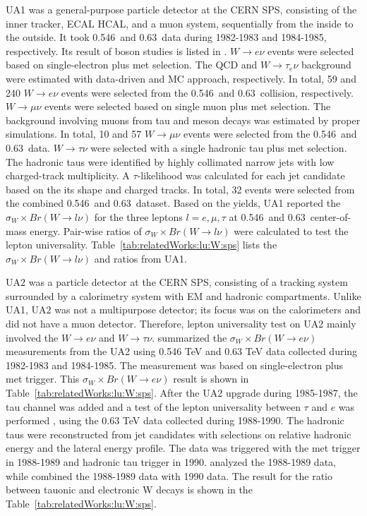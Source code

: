 UA1 was a general-purpose particle detector at the CERN SPS, consisting of the inner tracker, ECAL HCAL, and a muon system, sequentially from the inside to the outside.  It took 0.546~\TeV and 0.63~\TeV data during 1982-1983 and 1984-1985, respectively. Its result of \PW boson studies is listed in \cite{Albajar:1988ka}. $W \to e \nu$ events were selected based on single-electron plus met selection. The QCD and $W\to \tau_e \nu$ background were estimated with data-driven and MC approach, respectively. In total, 59 and 240 $W \to e \nu$ events were selected from the 0.546~\TeV and 0.63~\TeV collision, respectively.  $W \to \mu \nu$ events were selected based on single muon plus met selection. The background involving muons from tau and meson decays was estimated by proper simulations. In total, 10 and 57 $W\to \mu\nu$ events were selected from the 0.546~\TeV and 0.63~\TeV data.  $W\to \tau \nu$ were selected with a single hadronic tau plus met selection. The hadronic taus were identified by highly collimated narrow jets with low charged-track multiplicity.  A $\tau$-likelihood was calculated for each jet candidate based on the its shape and charged tracks. In total, 32 events were selected from the combined 0.546~\TeV and 0.63~\TeV dataset. Based on the yields, UA1 reported the $\sigma_W \times Br(W\to l\nu) $ for the three leptons $l=e,\mu,\tau$ at 0.546~\TeV and 0.63~\TeV center-of-mass energy. Pair-wise ratios of  $\sigma_W \times Br(W\to l\nu) $ were calculated to test the lepton universality. Table~\ref{tab:relatedWorks:lu:W:sps} lists the $\sigma_W \times Br(W\to l\nu) $ and ratios from UA1.



UA2 was a particle detector at the CERN SPS, consisting of a tracking system surrounded by a calorimetry system with EM and hadronic compartments. Unlike UA1, UA2 was not a multipurpose detector; its focus was on the calorimeters and did not have a muon detector. Therefore, lepton universality test on UA2 mainly involved the $W \to e\nu$ and $W \to \tau \nu$. \cite{appel1986measurement} summarized the $\sigma_W \times Br(W\to e \nu) $ measurements from the UA2 using 0.546 TeV and 0.63 TeV data collected during 1982-1983 and 1984-1985. The measurement was based on single-electron plus met trigger. This  $\sigma_W \times Br(W\to e \nu) $ result is shown in Table~\ref{tab:relatedWorks:lu:W:sps}. After the UA2 upgrade during 1985-1987,  the tau channel was added and a test of the lepton universality between $\tau$ and $e$ was performed \cite{Alitti:1991eh, Alitti:1992hv}, using the 0.63 TeV data collected during 1988-1990. The hadronic taus were reconstructed from jet candidates with selections on relative hadronic energy and the lateral energy profile. The data was triggered with the met trigger in 1988-1989 and hadronic tau trigger in 1990. \cite{Alitti:1991eh} analyzed the 1988-1989 data, while \cite{Alitti:1992hv} combined the 1988-1989 data with 1990 data. The result \cite{Alitti:1992hv} for the ratio between tauonic and electronic W decays is shown in the Table~\ref{tab:relatedWorks:lu:W:sps}. 

